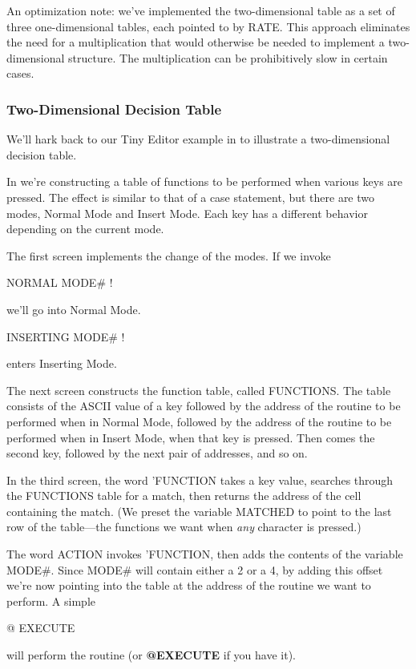 An optimization note: we've implemented the two-dimensional table
as a set of three one-dimensional tables, each pointed to by RATE. This
approach eliminates the need for a multiplication that would otherwise be
needed to implement a two-dimensional structure. The multiplication can
be prohibitively slow in certain cases.

\subsubsection{Two-Dimensional Decision Table}

We'll hark back to our Tiny Editor example in  to illustrate
a two-dimensional decision table.

In  we're constructing a table of functions to be performed
when various keys are pressed. The effect is similar to that of a
case statement, but there are two modes, Normal Mode and Insert Mode.
Each key has a different behavior depending on the current mode.

The first screen implements the change of the modes. If we invoke

\begin{Code}
NORMAL MODE# !
\end{Code}
we'll go into Normal Mode.

\begin{Code}
INSERTING MODE# !
\end{Code}
enters Inserting Mode.

The next screen constructs the function table, called FUNCTIONS.
The table consists of the ASCII value of a key followed by the address of
the routine to be performed when in Normal Mode, followed by the address
of the routine to be performed when in Insert Mode, when that key
is pressed. Then comes the second key, followed by the next pair of
addresses, and so on.

In the third screen, the word 'FUNCTION takes a key value,
searches through the FUNCTIONS table for a match, then returns the
address of the cell containing the match. (We preset the variable
MATCHED to point to the last row of the table---the functions we want
when \emph{any} character is pressed.)

The word ACTION invokes 'FUNCTION, then adds the contents of
the variable MODE\#. Since MODE\# will contain either a 2 or a 4, by
adding this offset we're now pointing into the table at the address
of the routine we want to perform. A simple

\begin{Code}
@ EXECUTE
\end{Code}
will perform the routine (or \textbf{@EXECUTE} if you have it).


